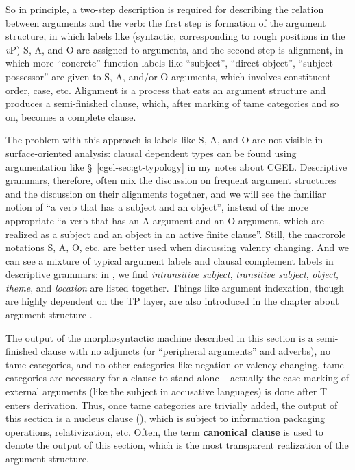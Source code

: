 \documentclass[UTF8, a4paper, oneside, scheme=plain]{ctexart}
\newcommand*{\citesec}[1]{\S~{#1}}
\newcommand*{\citechap}[1]{chap.~{#1}}
\newcommand*{\concept}[1]{\textbf{#1}}
\newcommand*{\term}[1]{\emph{#1}}
\newcommand*{\vP}{\textit{v}P}
\newcommand{\cgel}{\href{../English/cambridge.pdf}{my notes about CGEL}}
\begin{document}
So in principle, a two-step description is required for 
describing the relation between arguments and the verb:
the first step is formation of the argument structure,
in which labels like (syntactic, corresponding to rough positions in the \vP) S, A, and O 
are assigned to arguments,
and the second step is alignment,
in which more ``concrete'' function labels 
like ``subject'', ``direct object'', ``subject-possessor''
are given to S, A, and/or O arguments,
which involves constituent order, case, etc.
Alignment is a process that eats an argument structure 
and produces a semi-finished clause,
which, after marking of \ac{tame} categories and so on,
becomes a complete clause.

The problem with this approach is labels like S, A, and O are not visible in surface-oriented analysis:
clausal dependent types can be found using argumentation like 
\citesec{\ref{cgel-sec:gt-typology}} in \cgel.
Descriptive grammars, therefore,
often mix the discussion on frequent argument structures 
and the discussion on their alignments together, 
and we will see the familiar notion of ``a verb that has a subject and an object'',
instead of the more appropriate ``a verb that has an A argument and an O argument, %
which are realized as a subject and an object 
in an active finite clause''.
Still, the macrorole notations S, A, O, etc. are better used when discussing valency changing.
And we can see a mixture of typical argument labels and clausal complement labels
in descriptive grammars:
in \citet[\citesec{8.1}]{jacques2021grammar},
we find \term{intransitive subject}, \term{transitive subject}, \term{object},
\term{theme}, and \term{location} are listed together. 
Things like argument indexation,
though are highly dependent on the TP layer,
are also introduced in the chapter about argument structure 
\citet[\citechap{14}]{jacques2021grammar}.

The output of the morphosyntactic machine described in this section 
is a semi-finished clause with no adjuncts (or ``peripheral arguments'' and adverbs),
no \ac{tame} categories, and no other categories like negation or valency changing.
\ac{tame} categories are necessary for a clause to stand alone
-- actually the case marking of external arguments 
(like the subject in accusative languages) 
is done after T enters derivation.
Thus, once \ac{tame} categories are trivially added,
the output of this section is a nucleus clause (),
which is subject to information packaging operations,
relativization, etc.
Often, the term \concept{canonical clause} is used to denote the output of this section,
which is the most transparent realization of the argument structure.
\end{document}
